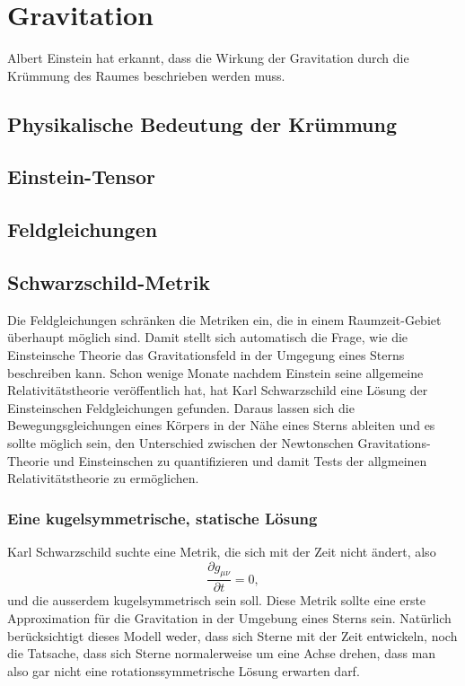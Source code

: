 %
%
%
\section{Gravitation%
\label{skript:kruemmung:sectipn:gravitation}}
Albert Einstein hat erkannt, dass die Wirkung der Gravitation 
durch die Krümmung des Raumes beschrieben werden muss.

\subsection{Physikalische Bedeutung der Krümmung}

\subsection{Einstein-Tensor}

\subsection{Feldgleichungen}

\subsection{Schwarzschild-Metrik}
Die Feldgleichungen schränken die Metriken ein, die in einem Raumzeit-Gebiet
überhaupt möglich sind.
Damit stellt sich automatisch die Frage, wie die Einsteinsche Theorie 
das Gravitationsfeld in der Umgegung eines Sterns beschreiben kann.
Schon wenige Monate nachdem Einstein seine allgemeine Relativitätstheorie
veröffentlich hat, hat Karl Schwarzschild eine Lösung der Einsteinschen
Feldgleichungen gefunden.
Daraus lassen sich die Bewegungsgleichungen eines Körpers in der Nähe
eines Sterns ableiten und es sollte möglich sein, den Unterschied zwischen
der Newtonschen Gravitations-Theorie und Einsteinschen  zu quantifizieren
und damit Tests der allgmeinen Relativitätstheorie zu ermöglichen.

\subsubsection{Eine kugelsymmetrische, statische Lösung}
Karl Schwarzschild suchte eine Metrik, die sich mit der Zeit nicht ändert,
also
\[
\frac{\partial g_{\mu\nu}}{\partial t}=0,
\]
und die ausserdem kugelsymmetrisch sein soll.
Diese Metrik sollte eine erste Approximation für die Gravitation in
der Umgebung eines Sterns sein.
Natürlich berücksichtigt dieses Modell weder, dass sich Sterne mit
der Zeit entwickeln, noch die Tatsache, dass sich Sterne normalerweise
um eine Achse drehen, dass man also gar nicht eine rotationssymmetrische
Lösung erwarten darf.

